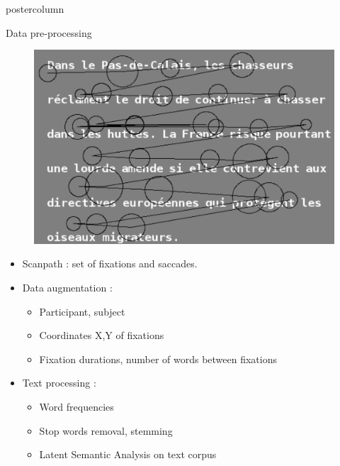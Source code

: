 \documentclass[final,hyperref={pdfpagelabels=false}]{beamer}
\begin{document}
\begin{frame}
\begin{columns}
\begin{column}{.49\textwidth}
\begin{beamercolorbox}[center,wd=\textwidth]{postercolumn}
\begin{minipage}[T]{.95\textwidth}
{\begin{block}{Data pre-processing}
                \begin{minipage}{0.45\textwidth}
                    \begin{figure}[H]
                        \includegraphics[width=1\linewidth]{s4t9bl.png}
                    \end{figure}
                \end{minipage} \hfill
                \begin{minipage}{0.45\textwidth}
                    \begin{itemize}
                        \item[\bullet] Scanpath : set of fixations and saccades.
                        \item[\bullet] Data augmentation :
                        \begin{itemize}
                            \item[\bullet] Participant, subject
                            \item[\bullet] Coordinates X,Y of fixations
                            \item[\bullet] Fixation durations, number of words between fixations
                        \end{itemize}
                        \item[\bullet] Text processing :
                        \begin{itemize}
                            \item[\bullet] Word frequencies
                            \item[\bullet] Stop words removal, stemming
                            \item[\bullet] Latent Semantic Analysis on text corpus

\end{itemize}
\end{itemize}
\end{minipage}
\end{block}}
\end{minipage}
\end{beamercolorbox}
\end{column}
\end{columns}
\end{frame}
\end{document}
